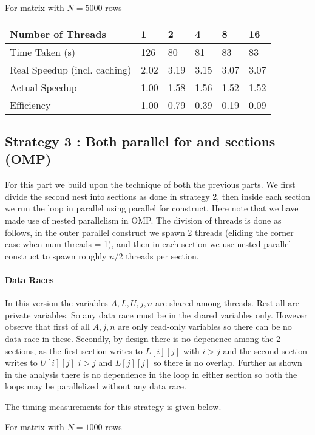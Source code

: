 \documentclass{article}
\begin{document}
For matrix with $N=5000$ rows

\begin{table}[H]
\centering
\begin{tabular}{l|lllll}
Number of Threads            & 1    & 2    & 4    & 8    & 16   \\ \hline
Time Taken (s)               & 126  & 80   & 81   & 83   & 83   \\
Real Speedup (incl. caching) & 2.02 & 3.19 & 3.15 & 3.07 & 3.07 \\
Actual Speedup               & 1.00 & 1.58 & 1.56 & 1.52 & 1.52 \\
Efficiency                   & 1.00 & 0.79 & 0.39 & 0.19 & 0.09
\end{tabular}
\end{table}

\subsection{Strategy 3 : Both parallel for and sections (OMP)}
For this part we build upon the technique of both the previous parts. We first divide the second nest into sections as done in strategy 2, then inside each section we run the loop in parallel using parallel for construct. Here note that we have made use of nested parallelism in OMP. The division of threads is done as follows, in the outer parallel construct we spawn 2 threads (eliding the corner case when num threads = 1), and then in each section we use nested parallel construct to spawn roughly $n/2$ threads per section. 

\paragraph{Data Races} In this version the variables $A, L, U, j, n$ are shared among threads. Rest all are private variables. So any data race must be in the shared variables only. However observe that first of all $A, j, n$ are only read-only variables so there can be no data-race in these. Secondly, by design there is no depenence among the 2 sections, as the first section writes to $L[i][j]$ with $i > j$ and the second section writes to $U[i][j]$ $i > j$ and $L[j][j]$ so there is no overlap. Further as shown in the analysis there is no dependence in the loop in either section so both the loops may be parallelized without any data race.

The timing measurements for this strategy is given below.

For matrix with $N=1000$ rows
\end{document}
